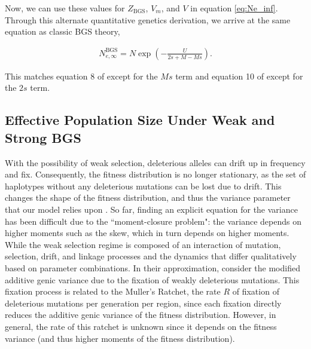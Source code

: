 \documentclass[11pt]{article}
\begin{document}
Now, we can use these values for $Z_\text{BGS}$, $V_m$, and $V$ in equation
\eqref{eq:Ne_inf}. Through this alternate quantitative genetics derivation, we
arrive at the same equation as classic BGS theory,

\begin{align}
  N_{e,\infty}^\text{BGS} = N \exp\left( - \frac{U}{2s + M - Ms} \right).
\end{align}

This matches equation 8 of \textcite{Hudson1995-xc} except for the $Ms$ term
and equation 10 of \textcite{Nordborg1996-nq} except for the $2s$ term.

\subsection{Effective Population Size Under Weak and Strong BGS} \label{supp:weak-strong}

With the possibility of weak selection, deleterious alleles can drift up in
frequency and fix. Consequently, the fitness distribution is no longer
stationary, as the set of haplotypes without any deleterious mutations can be
lost due to drift. This changes the shape of the fitness distribution, and thus
the variance parameter that our model relies upon
\parencite{Gessler1995-hz,OFallon2010-my,Good2013-lp,Haigh1978-gt,Higgs1995-xc}.
So far, finding an explicit equation for the variance has been difficult due to
the ``moment-closure problem": the variance depends on higher moments such as
the skew, which in turn depends on higher moments. While the weak selection
regime is composed of an interaction of mutation, selection, drift, and linkage
processes and the dynamics that differ qualitatively based on parameter
combinations. In their approximation, \textcite{Santiago2016-mu} consider the
modified additive genic variance due to the fixation of weakly deleterious
mutations. This fixation process is related to the Muller's Ratchet, the rate
$R$ of fixation of deleterious mutations per generation per region, since each
fixation directly reduces the additive genic variance of the fitness
distribution. However, in general, the rate of this ratchet is unknown since it
depends on the fitness variance (and thus higher moments of the fitness
distribution).

\end{document}
